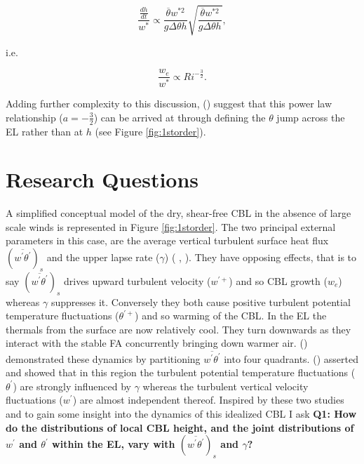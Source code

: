 \begin{equation}
\frac{\frac{dh}{dt}}{w^{*}} \propto \frac{\overline{\theta} w^{*2}}{g \Delta \theta h} \sqrt{\frac{\overline{\theta} w^{*2}}{g \Delta \theta h}},
\end{equation}

i.e.

\begin{equation}
\frac{w_{e}}{w^{*}} \propto Ri^{-\frac{3}{2}}.
\end{equation}

Adding further complexity to this discussion, \citeauthor{FedConzMir04} (\citeyear{FedConzMir04}) suggest that this power law relationship ($a = -\frac{3}{2}$) can be arrived at through defining the $\theta$ jump across the \acs{EL} rather than at $h$ (see Figure \ref{fig:1storder}).\\


\section{Research Questions}
\label{sec:resquest}

A simplified conceptual model of the dry, shear-free \acs{CBL} in the absence of large scale winds is represented in Figure \ref{fig:1storder}.  The two principal external parameters in this case, are the average vertical turbulent surface heat flux $(\overline{w^{'}\theta^{'}})_{s}$ and the upper lapse rate ($\gamma$) (\citeauthor{FedConzMir04} \citeyear{FedConzMir04},\citeauthor{Sorbjan} \citeyear{Sorbjan}).  They have opposing effects, that is to say $(\overline{w^{'}\theta^{'}})_{s}$ drives upward turbulent velocity ($w^{'+}$) and so \acs{CBL} growth ($w_{e}$) whereas $\gamma$  suppresses it.  Conversely they both cause positive turbulent potential temperature fluctuations ($\theta^{'+}$) and so warming of the \acs{CBL}.  In the \acs{EL} the thermals from the surface are now relatively cool.  They turn downwards as they interact with the stable \acs{FA} concurrently bringing down warmer air.  \citeauthor{SullMoengStev} (\citeyear{SullMoengStev}) demonstrated these dynamics by partitioning $\overline{w^{'} \theta^{'}}$ into four quadrants.  \citeauthor{Sorbjan} (\citeyear{Sorbjan}) asserted and showed that in this region the turbulent potential temperature fluctuations ($\theta^{'}$) are strongly influenced by $\gamma$ whereas the turbulent vertical velocity fluctuations ($w^{'}$) are almost independent thereof. Inspired by these two studies and to gain some insight into the dynamics of this idealized \acs{CBL} I ask \textbf{Q1: How do the distributions of local \acs{CBL} height, and the joint distributions of $w^{'}$ and $\theta^{'}$ within the \acs{EL}, vary with $(\overline{w^{'}\theta^{'}})_{s}$ and $\gamma$?}\\

